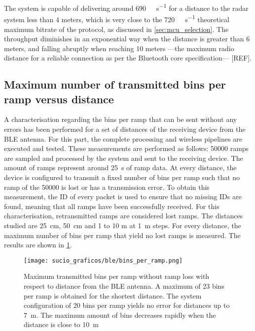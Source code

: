 The system is capable of delivering around \SI{690}{\kilo\bit\per\second} for a distance to the radar system less than 4 meters, which is very close to the \SI{720}{\kilo\bit\per\second} theoretical maximum bitrate of the protocol, as discussed in \cref{sec:mcu_selection}. The throughput diminishes in an exponential way when the distance is greater than 6 meters, and falling abruptly when reaching 10 meters ---the maximum radio distance for a reliable connection as per the Bluetooth core specification--- [REF].

\subsection{Maximum number of transmitted bins per ramp versus distance} \label{sec:max_number_bins_vs_distance}

A characterisation regarding the bins per ramp that can be sent without any errors has been performed for a set of distances of the receiving device from the BLE antenna. For this part, the complete processing and wireless pipelines are executed and tested. These measurements are performed as follows: 50000 ramps are sampled and processed by the system and sent to the receiving device. The amount of ramps represent around \SI{25}{\second} of ramp data. At every distance, the device is configured to transmit a fixed number of bins per ramp such that no ramp of the 50000 is lost or has a transmission error. To obtain this measurement, the ID of every packet is used to ensure that no missing IDs are found, meaning that all ramps have been successfully received. For this characterisation, retransmitted ramps are considered lost ramps. The distances studied are \SI{25}{\centi\metre}, \SI{50}{\centi\metre} and 1 to 10 \si{\metre} at \SI{1}{\metre} steps. For every distance, the maximum number of bins per ramp that yield no lost ramps is measured. The results are shown in \cref{fig:firmware_ble_char_bins}.

\begin{figure}[ht]
	\centering
	\texttt{[image: sucio\_graficos/ble/bins\_per\_ramp.png]}
	\caption{Maximum transmitted bins per ramp without ramp loss with respect to distance from the BLE antenna. A maximum of 23 bins per ramp is obtained for the shortest distance. The system configuration of 20 bins per ramp yields no error for distances up to \SI{7}{\metre}. The maximum amount of bins decreases rapidly when the distance is close to \SI{10}{\metre}
	\label{fig:firmware_ble_char_bins}}
\end{figure}

